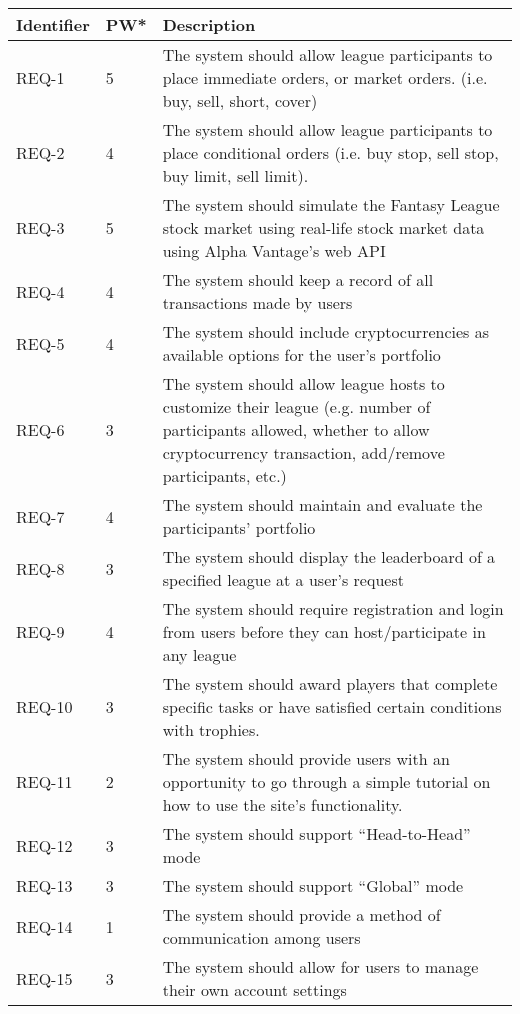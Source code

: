 \documentclass[11pt,letterpaper,oneside]{memoir}
\begin{document}
\renewcommand\arraystretch{2}
\begin{longtable}{|p{0.6in}|p{0.5in}|p{4.6in}|}
\hline
{\large \color{color1}Identifier}&{\large \color{color1}PW*}&{\large \color{color1}Description} \\ \hline

REQ-1 &5& The system should allow league participants to place immediate orders, or market orders. (i.e. buy, sell, short, cover) \\ \hline
REQ-2&
4&
The system should allow league participants to place conditional orders (i.e. buy stop, sell stop, buy limit, sell limit).\\ \hline
REQ-3&
5 &
The system should simulate the Fantasy League stock market using real-life stock market data using Alpha Vantage’s web API\\ \hline
REQ-4&
 4&
The system should keep a record of all transactions made by users \\ \hline
REQ-5&
4 &
The system should include cryptocurrencies as available options for the user’s portfolio \\ \hline
REQ-6&
 3&
The system should allow league hosts to customize their league (e.g. number of participants allowed, whether to allow cryptocurrency transaction, add/remove participants, etc.) \\ \hline
REQ-7&
4&
The system should maintain and evaluate the participants’ portfolio \\ \hline
REQ-8&
3&
The system should display the leaderboard of a specified league at a user’s request \\ \hline
REQ-9&
 4&
The system should require registration and login from users before they can host/participate in any league \\ \hline
REQ-10&
3 &
The system should award players that complete specific tasks or have satisfied certain conditions with trophies. \\ \hline
REQ-11 &
2 &
The system should provide users with an opportunity to go through a simple tutorial on how to use the site’s functionality. \\ \hline
REQ-12&
3&
The system should support “Head-to-Head” mode \\ \hline
REQ-13&
3&
The system should support “Global” mode \\ \hline
REQ-14&
1&
The system should provide a method of communication among users \\ \hline
REQ-15&
3&
The system should allow for users to manage their own account settings \\ \hline

\end{longtable}
\end{document}
